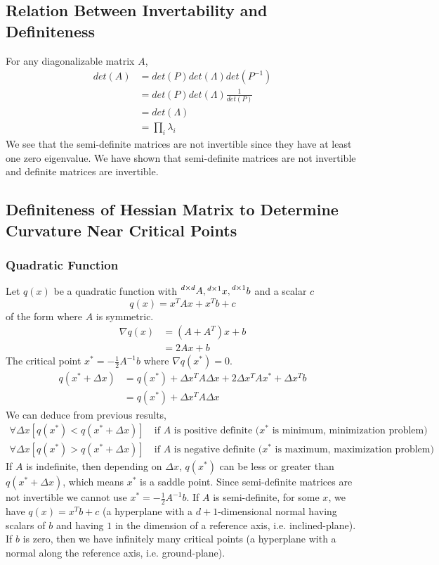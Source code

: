 \documentclass{article}
\numberwithin{equation}{subsection}
\begin{document}
\subsection{Relation Between Invertability and Definiteness}
For any diagonalizable matrix $A$, 
\begin{align}
    det(A) &= det(P) det(\Lambda) det(P^{-1})\\
    &= det(P) det(\Lambda) \frac{1}{det(P)}\\
    &= det(\Lambda)\\
    &= \prod_i \lambda_i
\end{align}
We see that the semi-definite matrices are not invertible since they have at least one zero eigenvalue. We have shown that semi-definite matrices are not invertible and definite matrices are invertible.
\subsection{Definiteness of Hessian Matrix to Determine Curvature Near Critical Points}
\subsubsection{Quadratic Function}
Let $q(x)$ be a quadratic function with $\prescript{d \times d}{}{A}, \prescript{d \times 1}{}{x}, \prescript{d \times 1}{}{b}$ and a scalar $c$
\begin{equation}
    q(x) = x^TAx+x^Tb+c
\end{equation}
of the form where $A$ is symmetric.
\begin{align}
    \nabla q(x) &= (A+A^T)x+b\\
     &= 2Ax+b
\end{align}
The critical point $x^* = -\frac{1}{2}A^{-1}b$ where $\nabla q(x^*) = 0$.
\begin{align}
    q(x^*+\Delta x) &= q(x^*) + \Delta x^TA\Delta x + 2\Delta x^TAx^* + \Delta x^Tb\\
    &= q(x^*) + \Delta x^TA\Delta x
\end{align}
We can deduce from previous results, 
\begin{align}
    \forall \Delta x [q(x^*) < q(x^*+\Delta x)] & \ \text{if $A$ is positive definite ($x^*$ is minimum, minimization problem)}\\
    \forall \Delta x [q(x^*) > q(x^*+\Delta x)] & \ \text{if $A$ is negative definite ($x^*$ is maximum, maximization problem)}
\end{align}
If $A$ is indefinite, then depending on $\Delta x$, $q(x^*)$ can be less or greater than $q(x^*+\Delta x)$, which means $x^*$ is a saddle point. Since semi-definite matrices are not invertible we cannot use $x^* = -\frac{1}{2}A^{-1}b$. If $A$ is semi-definite, for some $x$, we have $q(x) = x^Tb+c$ (a hyperplane with a $d+1$-dimensional normal having scalars of $b$ and having $1$ in the dimension of a reference axis, i.e. inclined-plane). If $b$ is zero, then we have infinitely many critical points (a hyperplane with a normal along the reference axis, i.e. ground-plane).
\end{document}
